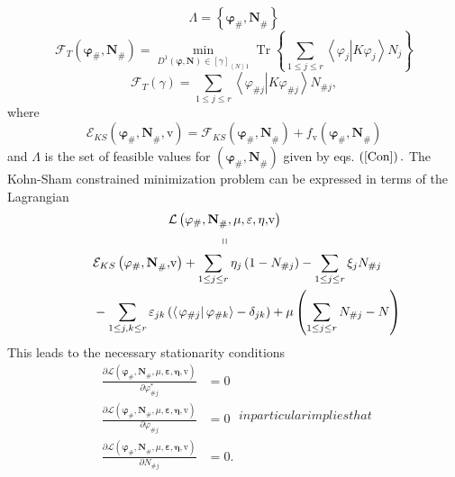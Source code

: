 \documentclass[aps,preprint]{revtex4}%
\begin{document}
\[
\Lambda=\left\{  \mathbf{\varphi}_{\#}\mathbf{,N}_{\#}\right\}
\]%
\[
\mathcal{F}_{T}\left(  \mathbf{\varphi}_{\#}\mathbf{,N}_{\#}\right)
=\min_{D^{1}\left(  \mathbf{\varphi,N}\right)  \in\left[  \gamma\right]
_{\left\langle N\right\rangle 1}}\operatorname{Tr}\left\{  \sum_{1\leq j\leq
r}\left\langle \varphi_{j}\left\vert K\varphi_{j}\right.  \right\rangle
N_{j}\right\}
\]%
\begin{equation}
\mathcal{F}_{T}\left(  \gamma\right)  =\sum_{1\leq j\leq r}\left\langle
\varphi_{\#j}\left\vert K\varphi_{\#j}\right.  \right\rangle N_{\#j},
\end{equation}
where
\[
\mathcal{E}_{KS}\left(  \mathbf{\varphi}_{\#}\mathbf{,N}_{\#}\mathbf{,}%
\mathrm{v}\right)  =\mathcal{F}_{KS}\left(  \mathbf{\varphi}_{\#}%
\mathbf{,N}_{\#}\right)  +f_{\mathrm{v}}\left(  \mathbf{\varphi}%
_{\#}\mathbf{,N}_{\#}\right)
\]
and $\mathcal{\Lambda}$ is the set of feasible values for $\left(
\mathbf{\varphi}_{\#}\mathbf{,N}_{\#}\right)  $ given by eqs. $\left(
\ref{Con}\right)  .$ The Kohn-Sham constrained minimization problem can be
expressed in terms of the Lagrangian
\begin{align*}
\qquad &  \qquad\qquad\qquad\mathcal{L}\left(  \mathbf{\varphi}_{\#}%
\mathbf{,N}_{\#},\mu,\mathbf{\varepsilon,\eta,}\mathrm{v}\right) \\
&  \qquad\qquad\qquad\qquad\qquad\left.  \shortparallel\right. \\
&  \mathcal{E}_{KS}\left(  \mathbf{\varphi}_{\#}\mathbf{,N}_{\#}%
\mathbf{,}\mathrm{v}\right)  +\sum_{1\leq j\leq r}\eta_{j}\left(
1-N_{\#j}\right)  -\sum_{1\leq j\leq r}\xi_{j}N_{\#j}\\
&  -\sum_{1\leq j,k\leq r}\varepsilon_{jk}\left(  \left\langle \left.
\varphi_{\#j}\right\vert \varphi_{\#k}\right\rangle -\delta_{jk}\right)
+\mu\left(  \sum_{1\leq j\leq r}N_{\#j}-N\right)
\end{align*}
This leads to the necessary stationarity conditions
\begin{subequations}
\begin{align*}
\frac{\partial\mathcal{L}\left(  \mathbf{\varphi}_{\#}\mathbf{,N}_{\#}%
,\mu,\mathbf{\varepsilon,\eta,}\mathrm{v}\right)  }{\partial\varphi
_{\#j}^{\ast}}  &  =0\\
\frac{\partial\mathcal{L}\left(  \mathbf{\varphi}_{\#}\mathbf{,N}_{\#}%
,\mu,\mathbf{\varepsilon,\eta,}\mathrm{v}\right)  }{\partial\varphi_{\#j}}  &
=0\\
\frac{\partial\mathcal{L}\left(  \mathbf{\varphi}_{\#}\mathbf{,N}_{\#}%
,\mu,\mathbf{\varepsilon,\eta,}\mathrm{v}\right)  }{\partial N_{\#j}}  &  =0.
\end{align*}
in particular implies that
\end{subequations}
\end{document}
